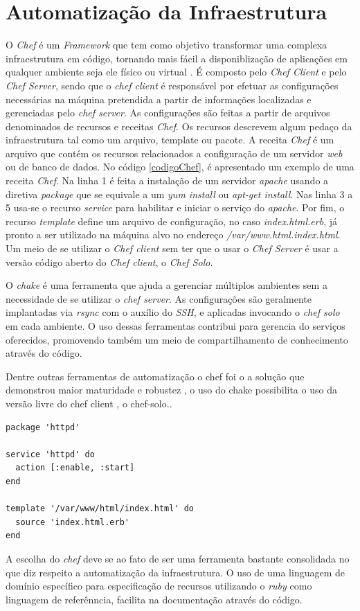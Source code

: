 \section{Automatização da Infraestrutura}
O \textit{Chef} é um \textit{Framework} que tem como objetivo transformar uma complexa infraestrutura em código,  tornando mais fácil a disponiblização de aplicações em qualquer ambiente seja ele físico ou virtual \cite{chef}. É composto pelo \textit{Chef Client} e pelo \textit{Chef Server}, sendo que o \textit{chef client} é responsável por efetuar as configurações necessárias na máquina pretendida a partir de informações localizadas e gerenciadas pelo \textit{chef server}. As configurações são feitas a partir de arquivos denominados de recursos e receitas \textit{Chef}. Os recursos descrevem algum pedaço da infraestrutura tal como um arquivo, template ou pacote. A receita \textit{Chef} é um arquivo que contém os recursos relacionados a configuração de um servidor \textit{web} ou de banco de dados. No código \ref{codigoChef}, é apresentado um exemplo de uma receita \textit{Chef}. Na linha 1 é feita a instalação de um servidor \textit{apache} usando a diretiva \textit{package} que se equivale a um \textit{yum install} ou \textit{apt-get install}. Nas linha 3 a 5 usa-se o recurso \textit{service} para habilitar e iniciar o serviço do \textit{apache}. Por fim, o recurso \textit{template} define um arquivo de configuração, no caso \textit{index.html.erb}, já pronto a ser utilizado na máquina alvo no endereço \textit{/var/www.html.index.html}. Um meio de se utilizar o \textit{Chef client} sem ter que o usar o \textit{Chef Server} é usar a versão código aberto do \textit{Chef client}, o \textit{Chef Solo}.

O \textit{chake} é uma ferramenta que ajuda a gerenciar múltiplos ambientes sem a necessidade de se utilizar o \textit{chef server}. As configurações são geralmente implantadas via \textit{rsync} com o auxílio do \textit{SSH}, e aplicadas invocando o \textit{chef solo} em cada ambiente. O uso dessas ferramentas contribui para gerencia do serviços oferecidos, promovendo também um meio de compartilhamento de conhecimento através do código.

Dentre outras ferramentas de automatização o chef foi o a solução que demonstrou maior maturidade e robustez , o uso do chake possibilita o uso da versão livre do chef client , o chef-solo.. 
\begin{lstlisting}[caption={Código exemplo de uma receita Chef}, label=codigoChef]
package 'httpd'

service 'httpd' do
  action [:enable, :start]
end

template '/var/www/html/index.html' do
  source 'index.html.erb'
end
\end{lstlisting}

A escolha do \textit{chef} deve se ao fato de ser uma ferramenta bastante consolidada no que diz respeito a automatização da infraestrutura.  O uso de uma linguagem de domínio específico para especificação de recursos utilizando o \textit{ruby} como linguagem de referênncia, facilita na documentação através do código.
